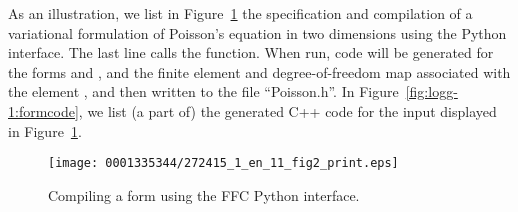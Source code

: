 As an illustration, we list in Figure~\ref{fig:logg-1:python:form} the
specification and compilation of a variational formulation of
Poisson's equation in two dimensions using the Python interface. The
last line calls the  function. When run, code will
be generated for the forms  and , and the finite element
and degree-of-freedom map associated with the element
, and then written to the file ``Poisson.h''.
In Figure~\ref{fig:logg-1:formcode}, we list (a part of) the generated
C++ code for the input displayed in Figure~\ref{fig:logg-1:python:form}.

\begin{figure}
\bwfig
%
%
%
\texttt{[image: 0001335344/272415\_1\_en\_11\_fig2\_print.eps]}
\caption{Compiling a form using the FFC Python interface.}
\label{fig:logg-1:python:form}
\end{figure}

\makeatletter
\def\img@cmode{\hskip-5pt\begin{turn}{90}\rlap{\kern24\p@\@img@cmode{\@cmodetext}}\end{turn}}
\makeatother


